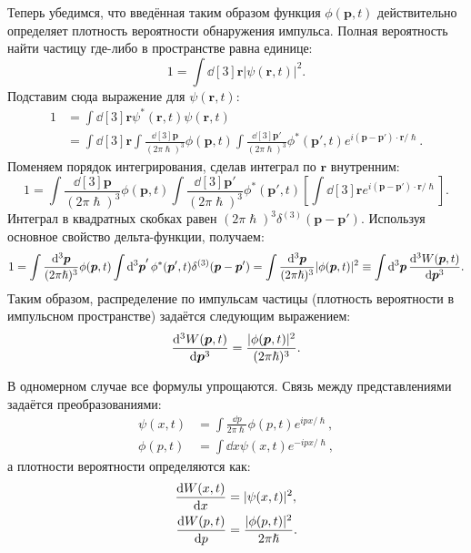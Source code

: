 \documentclass[a4paper, 12pt]{article}
\begin{document}
Теперь убедимся, что введённая таким образом функция $\phi(\bm{p}, t)$ действительно определяет плотность вероятности обнаружения импульса. Полная вероятность найти частицу где-либо в пространстве равна единице:
\begin{equation}
1 = \int \dd[3]{\bm{r}} |\psi(\bm{r}, t)|^2.
\end{equation}
Подставим сюда выражение для $\psi(\bm{r}, t)$:
\begin{align*}
1 &= \int \dd[3]{\bm{r}} \psi^*(\bm{r}, t) \psi(\bm{r}, t) \\
  &= \int \dd[3]{\bm{r}} \int \frac{\dd[3]{\bm{p}}}{(2\pi\hslash)^3}\phi(\bm{p}, t) \int \frac{\dd[3]{\bm{p}}'}{(2\pi\hslash)^3} \phi^*(\bm{p}', t) e^{i (\bm{p} - \bm{p}') \cdot \bm{r} / \hslash}.
\end{align*}
Поменяем порядок интегрирования, сделав интеграл по $\bm{r}$ внутренним:
\begin{equation*}
1 = \int \frac{\dd[3]{\bm{p}}}{(2\pi\hslash)^3}\phi(\bm{p}, t) \int \frac{\dd[3]{\bm{p}}'}{(2\pi\hslash)^3} \phi^*(\bm{p}', t) \left[ \int \dd[3]{\bm{r}} e^{i (\bm{p} - \bm{p}') \cdot \bm{r} / \hslash} \right].
\end{equation*}
Интеграл в квадратных скобках равен $(2\pi\hslash)^3 \delta^{(3)}(\bm{p} - \bm{p}')$. Используя основное свойство дельта-функции, получаем:
\begin{equation*}
  1 = \int \frac{\dd[3]{\bm{p}}}{(2\pi\hslash)^3} \phi(\bm{p}, t) \int \dd[3]{\bm{p}}' \phi^*(\bm{p}', t) \delta^{(3)}(\bm{p} - \bm{p}') = \int \frac{\dd[3]{\bm{p}}}{(2\pi\hslash)^3} |\phi(\bm{p}, t)|^2
  \equiv \int \dd[3]{\bm{p}} \dv[3]{W(\bm{p}, t)}{\bm{p}}.
\end{equation*}
Таким образом, распределение по импульсам частицы (плотность вероятности в импульсном пространстве) задаётся следующим выражением:
\begin{equation}
\dv[3]{W(\bm{p}, t)}{\bm{p}} = \frac{|\phi(\bm{p}, t)|^2}{(2\pi\hslash)^3}.
\end{equation}

В одномерном случае все формулы упрощаются. Связь между представлениями задаётся преобразованиями:
\begin{align}
\psi(x, t) &= \int \frac{\dd{p}}{2\pi\hslash} \phi(p, t) e^{i p x / \hslash}, \\
\phi(p, t) &= \int \dd{x} \psi(x, t) e^{-i p x / \hslash},
\end{align}
а плотности вероятности определяются как:
\begin{align}
\dv{W(x, t)}{x} &= |\psi(x, t)|^2, \\
\dv{W(p, t)}{p} &= \frac{|\phi(p, t)|^2}{2\pi\hslash}.
\end{align}
\end{document}
